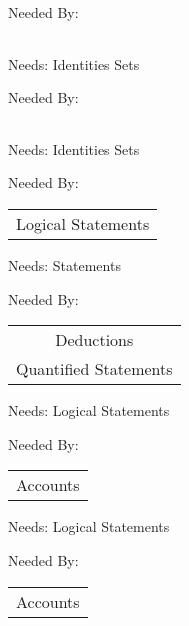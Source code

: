 Needed By: \begin{tabular}{c}
\end{tabular}
\clearpage{}

\newpage
\label{belongings}


\clearpage
Needs:  Identities  Sets 

Needed By: \begin{tabular}{c}
\end{tabular}
\clearpage{}

\newpage
\label{statements}


\clearpage
Needs:  Identities  Sets 

Needed By: \begin{tabular}{c} Logical Statements \\ 
\end{tabular}
\clearpage{}

\newpage
\label{logical_statements}


\clearpage
Needs:  Statements 

Needed By: \begin{tabular}{c} Deductions \\  Quantified Statements \\ 
\end{tabular}
\clearpage{}

\newpage
\label{deductions}


\clearpage
Needs:  Logical Statements 

Needed By: \begin{tabular}{c} Accounts \\ 
\end{tabular}
\clearpage{}

\newpage
\label{quantified_statements}


\clearpage
Needs:  Logical Statements 

Needed By: \begin{tabular}{c} Accounts \\ 
\end{tabular}
\clearpage{}

